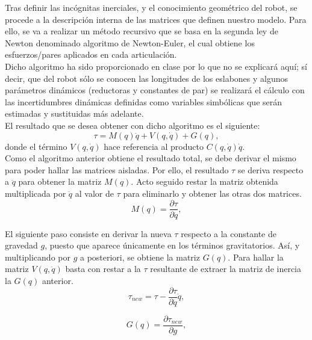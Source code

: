 \newpage

Tras definir las incógnitas inerciales, y el conocimiento geométrico del robot, se procede a la descripción interna de las
 matrices que definen nuestro modelo. Para ello, se va a realizar un método recursivo que se basa en la segunda ley de
 Newton denominado algoritmo de Newton-Euler, el cual obtiene los esfuerzos/pares aplicados en cada articulación.\\
 Dicho algoritmo ha sido proporcionado en clase por lo que no se explicará aquí; sí decir, que del robot sólo se conocen
 las longitudes de los eslabones y algunos parámetros dinámicos (reductoras y constantes de par) se realizará el cálculo
 con las incertidumbres dinámicas definidas como variables simbólicas que serán estimadas y sustituidas más adelante.\\

El resultado que se desea obtener con dicho algoritmo es el siguiente:\\
\begin{equation}
\tau=M(q)\ddot{q}+V(q,\dot{q})+G(q),
\end{equation}
donde el término $V(q,\dot{q})$ hace referencia al producto $C(q,\dot{q})\dot{q}$.\\

Como el algoritmo anterior obtiene el resultado total, se debe derivar el mismo para poder hallar las matrices aisladas. Por ello, el resultado $\tau$ se deriva respecto a $\ddot{q}$ para obtener la matriz $M(q)$. Acto seguido restar la matriz obtenida multiplicada por $\ddot{q}$ al valor de $\tau$ para eliminarlo y obtener las otras dos matrices.\\
\begin{equation}
M(q)=\dfrac{\partial{\tau}}{\partial{\ddot{q}}},
\end{equation}

El siguiente paso consiste en derivar la nueva $\tau$ respecto a la constante de gravedad $g$, puesto que aparece únicamente en los términos gravitatorios. Así, y multiplicando por $g$ a posteriori, se obtiene la matriz $G(q)$. Para hallar la matriz $V(q,\dot{q})$ basta con restar a la $\tau$ resultante de extraer la matriz de inercia la $G(q)$ anterior.\\
\begin{equation}
\tau_{new}=\tau-\dfrac{\partial{\tau}}{\partial{\ddot{q}}}\ddot{q},
\end{equation}

\begin{equation}
G(q)=\dfrac{\partial{\tau_{new}}}{\partial{g}},
\end{equation}

